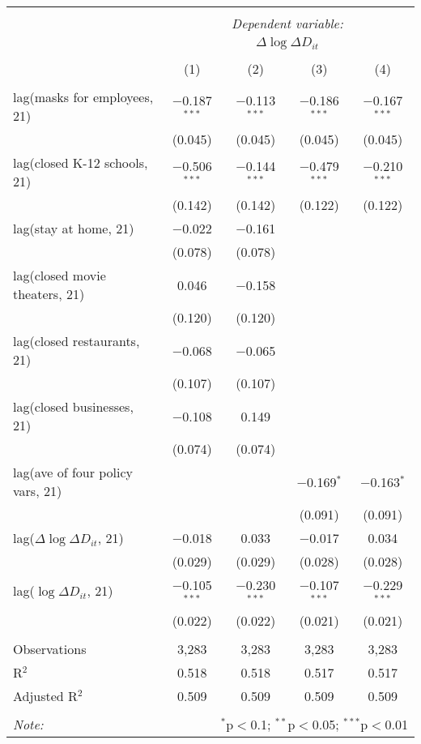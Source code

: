 \begin{tabular}{@{\extracolsep{1pt}}lcccc} 
\\[-1.8ex]\hline 
\hline \\[-1.8ex] 
 & \multicolumn{4}{c}{\textit{Dependent variable:}} \\ 
\cline{2-5} 
 & \multicolumn{4}{c}{$\Delta \log \Delta D_{it}$} \\ 
\\[-1.8ex] & (1) & (2) & (3) & (4)\\ 
\hline \\[-1.8ex] 
 lag(masks for employees, 21) & $-$0.187$^{***}$ & $-$0.113$^{***}$ & $-$0.186$^{***}$ & $-$0.167$^{***}$ \\ 
  & (0.045) & (0.045) & (0.045) & (0.045) \\ 
  lag(closed K-12 schools, 21) & $-$0.506$^{***}$ & $-$0.144$^{***}$ & $-$0.479$^{***}$ & $-$0.210$^{***}$ \\ 
  & (0.142) & (0.142) & (0.122) & (0.122) \\ 
  lag(stay at home, 21) & $-$0.022 & $-$0.161 &  &  \\ 
  & (0.078) & (0.078) &  &  \\ 
  lag(closed movie theaters, 21) & 0.046 & $-$0.158 &  &  \\ 
  & (0.120) & (0.120) &  &  \\ 
  lag(closed restaurants, 21) & $-$0.068 & $-$0.065 &  &  \\ 
  & (0.107) & (0.107) &  &  \\ 
  lag(closed businesses, 21) & $-$0.108 & 0.149 &  &  \\ 
  & (0.074) & (0.074) &  &  \\ 
  lag(ave of four policy vars, 21) &  &  & $-$0.169$^{*}$ & $-$0.163$^{*}$ \\ 
  &  &  & (0.091) & (0.091) \\ 
  lag($\Delta \log \Delta D_{it}$, 21) & $-$0.018 & 0.033 & $-$0.017 & 0.034 \\ 
  & (0.029) & (0.029) & (0.028) & (0.028) \\ 
  lag($\log \Delta D_{it}$, 21) & $-$0.105$^{***}$ & $-$0.230$^{***}$ & $-$0.107$^{***}$ & $-$0.229$^{***}$ \\ 
  & (0.022) & (0.022) & (0.021) & (0.021) \\ 
 \hline \\[-1.8ex] 
Observations & 3,283 & 3,283 & 3,283 & 3,283 \\ 
R$^{2}$ & 0.518 & 0.518 & 0.517 & 0.517 \\ 
Adjusted R$^{2}$ & 0.509 & 0.509 & 0.509 & 0.509 \\ 
\hline 
\hline \\[-1.8ex] 
\textit{Note:}  & \multicolumn{4}{r}{$^{*}$p$<$0.1; $^{**}$p$<$0.05; $^{***}$p$<$0.01} \\ 
\end{tabular} 